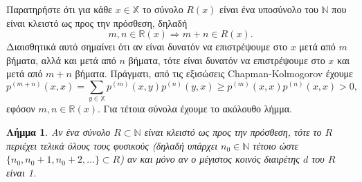 \documentclass[11pt]{article}
\newcommand{\en}[1]{\textlatin{#1}}
\newtheorem{lemma}{Λήμμα}
\def\N{\mathbb{N}}
\def\X{\mathbb{X}}
\def\R{\mathbb{R}}
\begin{document}
\noindent
Παρατηρήστε ότι για κάθε $x\in\X$ το σύνολο $R(x)$ είναι ένα υποσύνολο του $\N$ που είναι κλειστό ως προς την πρόσθεση, δηλαδή
\[
m,n\in\R(x)\Rightarrow m+n\in R(x).
\]
Διαισθητικά αυτό σημαίνει ότι αν είναι δυνατόν να επιστρέψουμε στο $x$ μετά από $m$ βήματα, αλλά και μετά από $n$ βήματα, τότε είναι δυνατόν να επιστρέψουμε στο $x$ και μετά από $m+n$ βήματα. Πράγματι, από τις εξισώσεις \en{Chapman-Kolmogorov} έχουμε
\[
p^{(m+n)}(x,x)=\sum_{y\in\X}p^{(m)}(x,y)p^{(n)}(y,x)\ge p^{(m)}(x,x)p^{(n)}(x,x)>0,
\]
εφόσον $m,n\in\R(x)$. Για τέτοια σύνολα έχουμε το ακόλουθο λήμμα.
\begin{lemma}
Αν ένα σύνολο $R\subset\N$ είναι κλειστό ως προς την πρόσθεση, τότε το $R$ περιέχει τελικά όλους τους φυσικούς (δηλαδή υπάρχει $n_0\in\N$ τέτοιο ώστε $\{n_0,n_0+1,n_0+2,\ldots\}\subset R$) αν και μόνο αν ο μέγιστος κοινός διαιρέτης $d$ του $R$ είναι 1.
\end{lemma}
\end{document}
